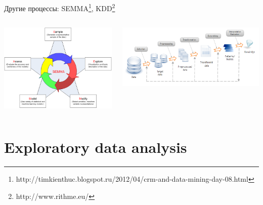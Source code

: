 \documentclass[aspectratio=169]{beamer}
\begin{document}
\begin{frame}{Другие процессы: SEMMA\footnote{http://timkienthuc.blogspot.ru/2012/04/crm-and-data-mining-day-08.html}, KDD\footnote{http://www.rithme.eu/}}

\begin{columns}
    \begin{column}{.5\textwidth}
    	\includegraphics[width=\textwidth]{images/semma.png}
    \end{column}

    \begin{column}{.5\textwidth}
    \vspace{-0em}
	\begin{center}
   		\includegraphics[width=\textwidth]{images/kdd.png}
    \end{center}
    \end{column}
  \end{columns}

\end{frame}

\section{Exploratory data analysis}
\end{document}

